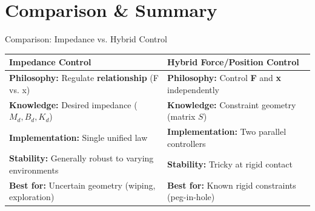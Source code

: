 \documentclass[10pt]{beamer}
\begin{document}
\section{Comparison \& Summary}
\begin{frame}{Comparison: Impedance vs. Hybrid Control}
    \begin{table}
    \centering
    \begin{tabular}{p{} p{}}
    \toprule
    \textbf{Impedance Control} & \textbf{Hybrid Force/Position Control} \\
    \midrule
    \textbf{Philosophy:} Regulate \textbf{relationship} (F vs. x) & \textbf{Philosophy:} Control \textbf{F} and \textbf{x} independently \\
    \textbf{Knowledge:} Desired impedance ($M_d, B_d, K_d$) & \textbf{Knowledge:} Constraint geometry (matrix $S$) \\
    \textbf{Implementation:} Single unified law & \textbf{Implementation:} Two parallel controllers \\
    \textbf{Stability:} Generally robust to varying environments & \textbf{Stability:} Tricky at rigid contact \\
    \textbf{Best for:} Uncertain geometry (wiping, exploration) & \textbf{Best for:} Known rigid constraints (peg-in-hole) \\
    \bottomrule
    \end{tabular}
    \end{table}
\end{frame}
\end{document}
